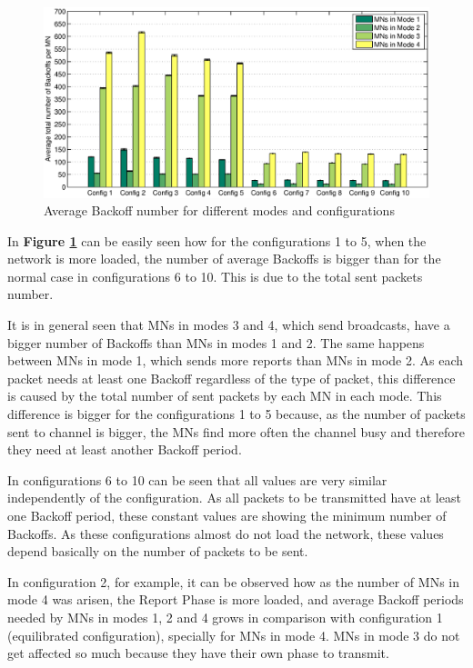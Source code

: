 \begin{figure}[ht]
 \begin{center}
  \includegraphics[width=1\textwidth]{BackoffNumberInMN.eps}
 \end{center}
 \caption{Average Backoff number for different modes and configurations}
 \label{fig:BackoffNumberInMN}
\end{figure}

In \textbf{Figure \ref{fig:BackoffNumberInMN}} can be easily seen how for the configurations 1 to 5, when the network is more loaded, the number of 
average Backoffs is bigger than for the normal case in configurations 6 to 10. This is due to the total sent packets number.

It is in general seen that \acp{MN} in modes 3 and 4, which send broadcasts, have a bigger number of Backoffs than \acp{MN} in modes 1 and 2. The same 
happens between \acp{MN} in mode 1, which sends more reports than \acp{MN} in mode 2. As each packet needs at least one Backoff regardless of the type of 
packet, this difference is caused by the total number of sent packets by each \ac{MN} in each mode. This difference is bigger for the configurations 1 
to 5 because, as the number of packets sent to channel is bigger, the \acp{MN} find more often the channel busy and therefore they need at least another Backoff
period.

In configurations 6 to 10 can be seen that all values are very similar independently of the configuration. As all packets to be transmitted have at least
one Backoff period, these constant values are showing the minimum number of Backoffs. As these configurations almost do not load the network, these values 
depend basically on the number of packets to be sent.

In configuration 2, for example, it can be observed how as the number of \acp{MN} in mode 4 was arisen, the Report Phase is more loaded, and average
Backoff periods needed by \acp{MN} in modes 1, 2 and 4 grows in comparison with configuration 1 (equilibrated configuration), specially for \acp{MN} in
mode 4. \acp{MN} in mode 3 do not get affected so much because they have their own phase to transmit.

